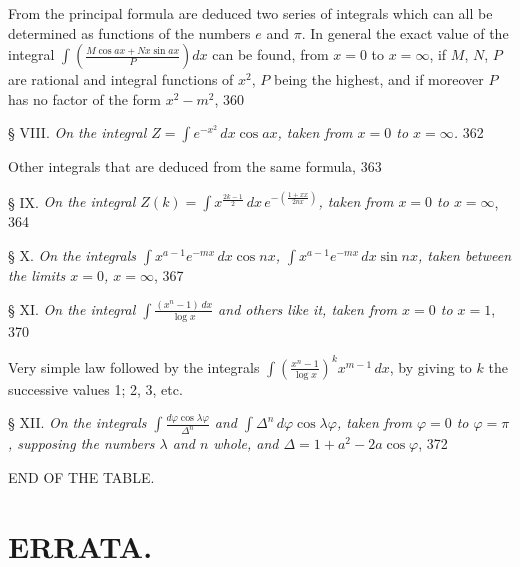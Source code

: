 \documentclass{article}
\begin{document}
From the principal formula are deduced two series of integrals which can all be determined as functions of the numbers $e$ and $\pi$. In general the exact value of the integral $\displaystyle\int\left(\frac{M\cos ax+Nx\sin ax}{P}\right)dx$ can be found, from $x=0$ to $x=\infty$, if $M$, $N$, $P$ are rational and integral functions of $x^{2}$, $P$ being the highest, and if moreover $P$ has no factor of the form $x^{2}-m^{2}$, 360

§ VIII. \emph{On the integral $Z=\displaystyle\int e^{-x^{2}}\,dx\cos ax$, taken from $x=0$ to $x=\infty$.} 362

Other integrals that are deduced from the same formula, 363

§ IX. \emph{On the integral $Z(k)=\displaystyle\int x^{\frac{2k-1}{2}}\,dx\,e^{-\left(\frac{1+xx}{2nx}\right)}$, taken from $x=0$ to $x=\infty$}, 364

§ X. \emph{On the integrals $\displaystyle\int x^{a-1}e^{-mx}\,dx\cos nx$, $\displaystyle\int x^{a-1}e^{-mx}\,dx\sin nx$, taken between the limits $x=0$, $x=\infty$}, 367

§ XI. \emph{On the integral $\displaystyle\int\frac{(x^{n}-1)\,dx}{\log x}$ and others like it, taken from $x=0$ to $x=1$}, 370

Very simple law followed by the integrals $\displaystyle\int\left(\frac{x^{n}-1}{\log x}\right)^{k}x^{m-1}\,dx$, by giving to $k$ the successive values 1; 2, 3, etc.

§ XII. \emph{On the integrals $\displaystyle\int\frac{d\varphi\cos\lambda\varphi}{\Delta^{n}}$ and $\displaystyle\int\Delta^{n}\,d\varphi\cos\lambda\varphi$, taken from $\varphi=0$ to $\varphi=\pi$, supposing the numbers $\lambda$ and $n$ whole, and $\Delta=1+a^{2}-2a\cos\varphi$}, 372

END OF THE TABLE.


\section*{ERRATA.}
\end{document}
